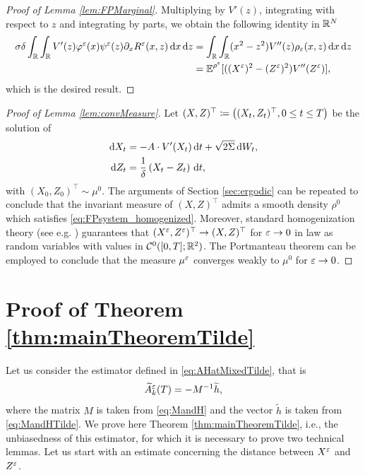 \documentclass[10pt]{article}
\begin{document}
\begin{appendices}
\begin{proof}[Proof of Lemma \ref{lem:FPMarginal}]
	Multiplying by $V'(z)$, integrating with respect to $z$ and integrating by parts, we obtain the following identity in $\mathbb{R}^N$
	\begin{equation}
	\begin{aligned}
	\sigma \delta \int_{\mathbb{R}} \int_{\mathbb{R}} V'(z) \varphi^\varepsilon(x) \psi^\varepsilon(z) \partial_x R^\varepsilon(x,z) \,\mathrm{d} x \,\mathrm{d} z &=  \int_{\mathbb{R}} \int_{\mathbb{R}} (x^2 - z^2) V''(z) \rho_\varepsilon(x,z) \,\mathrm{d} x \,\mathrm{d} z \\
	&= \operatorname{\mathbb{E}}^{\rho^\varepsilon}[((X^\varepsilon)^2 - (Z^\varepsilon)^2)V''(Z^\varepsilon)],
	\end{aligned}
	\end{equation}
	which is the desired result.
\end{proof}

\begin{proof}[Proof of Lemma \ref{lem:convMeasure}] Let $(X, Z)^\top \coloneqq \left((X_t, Z_t)^\top, 0\leq t \leq T\right)$ be the solution of
	\begin{equation}
	\label{eq:systemSDEHom}
	\begin{aligned}
	\mathrm{d} X_t &= -A \cdot V'(X_t) \,\mathrm{d} t + \sqrt{2\Sigma} \,\mathrm{d} W_t, \\
	\mathrm{d} Z_t &= \frac{1}{\delta} \left ( X_t - Z_t \right ) \,\mathrm{d} t,
	\end{aligned}
	\end{equation} 
	with $(X_0, Z_0)^\top \sim \mu^0$. The arguments of Section \ref{sec:ergodic} can be repeated to conclude that the invariant measure of $(X, Z)^\top$ admits a smooth density $\rho^0$ which satisfies \eqref{eq:FPsystem_homogenized}. Moreover, standard homogenization theory (see e.g. \cite[Chapter 3]{BLP78}) guarantees that $(X^\varepsilon,Z^\varepsilon)^\top \to (X,Z)^\top$ for $\varepsilon \to 0$ in law as random variables with values in $\mathcal C^0([0, T]; \mathbb{R}^2)$. The Portmanteau theorem can be employed to conclude that the measure $\mu^\varepsilon$ converges weakly to $\mu^0$ for $\varepsilon \to 0$.
\end{proof}

\section{Proof of Theorem \ref{thm:mainTheoremTilde}}\label{ap:EstimatorTilde}
Let us consider the estimator defined in \eqref{eq:AHatMixedTilde}, that is
\begin{equation}
	\widetilde A^\varepsilon_k(T) = -M^{-1}\widetilde h,
\end{equation}
where the matrix $M$ is taken from \eqref{eq:MandH} and the vector $\widetilde{h}$ is taken from \eqref{eq:MandHTilde}. We prove here Theorem \ref{thm:mainTheoremTilde}, i.e., the unbiasedness of this estimator, for which it is necessary to prove two technical lemmas. Let us start with an estimate concerning the distance between $X^\varepsilon$ and $Z^\varepsilon$. 


\end{appendices}
\end{document}
